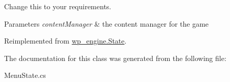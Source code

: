 Change this to your requirements. 
\begin{DoxyParams}{Parameters}
{\em content\-Manager} & the content manager for the game \\
\hline
\end{DoxyParams}


Reimplemented from \hyperlink{classwp__engine_1_1_state}{wp\-\_\-engine.\-State}.



The documentation for this class was generated from the following file\-:\begin{DoxyCompactItemize}
\item 
Menu\-State.\-cs\end{DoxyCompactItemize}
